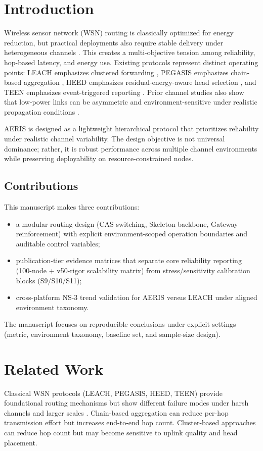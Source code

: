 ﻿\documentclass[sensors,article,submit,moreauthors,pdftex]{Definitions/mdpi}
\begin{document}
\section{Introduction}
Wireless sensor network (WSN) routing is classically optimized for energy reduction, but practical deployments also require stable delivery under heterogeneous channels \cite{Akyildiz2002Survey,Rault2016Energy,Kandris2020}. This creates a multi-objective tension among reliability, hop-based latency, and energy use. Existing protocols represent distinct operating points: LEACH emphasizes clustered forwarding \cite{Heinzelman2000LEACH}, PEGASIS emphasizes chain-based aggregation \cite{Lindsey2002PEGASIS}, HEED emphasizes residual-energy-aware head selection \cite{Younis2004HEED}, and TEEN emphasizes event-triggered reporting \cite{Manjeshwar2001TEEN}. Prior channel studies also show that low-power links can be asymmetric and environment-sensitive under realistic propagation conditions \cite{Zuniga2004,Zuniga2007Asymmetry,Baccour2012RLQE}.

AERIS is designed as a lightweight hierarchical protocol that prioritizes reliability under realistic channel variability. The design objective is not universal dominance; rather, it is robust performance across multiple channel environments while preserving deployability on resource-constrained nodes.

\subsection*{Contributions}
This manuscript makes three contributions:
\begin{itemize}
\item a modular routing design (CAS switching, Skeleton backbone, Gateway reinforcement) with explicit environment-scoped operation boundaries and auditable control variables;
\item publication-tier evidence matrices that separate core reliability reporting (100-node + v50-rigor scalability matrix) from stress/sensitivity calibration blocks (S9/S10/S11);
\item cross-platform NS-3 trend validation for AERIS versus LEACH under aligned environment taxonomy.
\end{itemize}
The manuscript focuses on reproducible conclusions under explicit settings (metric, environment taxonomy, baseline set, and sample-size design).

\section{Related Work}
Classical WSN protocols (LEACH, PEGASIS, HEED, TEEN) provide foundational routing mechanisms but show different failure modes under harsh channels and larger scales \cite{Heinzelman2002LEACH,Lindsey2002PEGASIS,Younis2004HEED,Kandris2020}. Chain-based aggregation can reduce per-hop transmission effort but increases end-to-end hop count. Cluster-based approaches can reduce hop count but may become sensitive to uplink quality and head placement.
\end{document}
